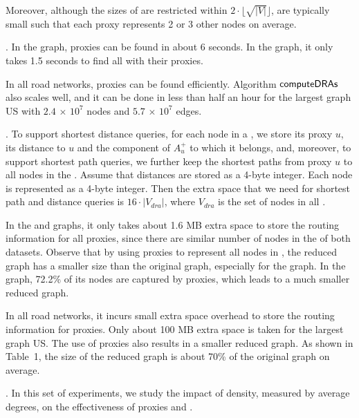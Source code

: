  Moreover, although the sizes of \dras are restricted within $2\cdot\lfloor\sqrt{|V|}\rfloor$, \dras are typically small such that each proxy represents 2 or 3 other nodes on average.


.
In the \dblp graph, proxies can be found in about 6 seconds. In the \dblpone graph, it only takes 1.5 seconds to find all \dras with their proxies.

In all road networks, proxies can be found efficiently. Algorithm ${\mathsf{computeDRAs}}$ also scales well, and it can be done in less than half an hour for the largest graph US with $2.4$ $\times$ $10^7$ nodes and $5.7$ $\times$ $10^7$ edges.

.
To support shortest distance queries, for each node in a \dra, we store its proxy $u$, its distance to $u$ and the component of $A^{+}_u$ to which it belongs, and, moreover, to support shortest path queries, we further keep the shortest paths from proxy $u$ to all nodes in the \dra. Assume that distances are stored as a 4-byte integer. Each node is represented as a 4-byte integer. Then the extra space that we need for shortest path and distance queries is $16\cdot |V_{dra}|$, where $V_{dra}$ is the set of nodes in all \dras.

In the \dblp and \dblpone graphs, it only takes about 1.6 MB extra space to store the routing information for all proxies, since there are similar number of nodes in the \dras of both datasets. Observe that by using proxies to represent all nodes in \dras, the reduced graph  has a smaller size than the original graph, especially for the \dblpone graph. In the \dblpone graph, 72.2\% of its nodes are captured by proxies, which leads to a much smaller reduced graph.

In all road networks, it incurs small extra space overhead to store the routing information for proxies. Only about 100 MB extra space is taken for the largest graph US. The use of proxies also results in a smaller reduced graph. As shown in Table~1, the size of the reduced graph is about 70\% of the original graph on average.


.
In this set of experiments, we study the impact of density, measured by average degrees, on the effectiveness of proxies and \dras. 

